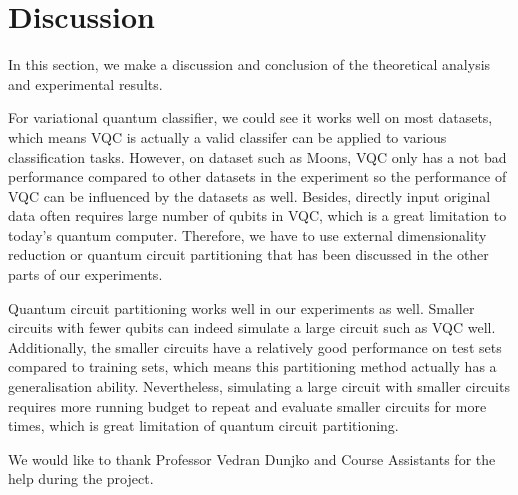 \documentclass[sigconf]{acmart}
\begin{document}

\section{Discussion}
In this section, we make a discussion and conclusion of the theoretical analysis and experimental results.

For variational quantum classifier, we could see it works well on most datasets, which means VQC is actually a valid classifer can be applied to various classification tasks. However, on dataset such as Moons, VQC only has a not bad performance compared to other datasets in the experiment so the performance of VQC can be influenced by the datasets as well. Besides, directly input original data often requires large number of qubits in VQC, which is a great limitation to today's quantum computer. Therefore, we have to use external dimensionality reduction or quantum circuit partitioning that has been discussed in the other parts of our experiments.

Quantum circuit partitioning works well in our experiments as well. Smaller circuits with fewer qubits can indeed simulate a large circuit such as VQC well. Additionally, the smaller circuits have a relatively good performance on test sets compared to training sets, which means this partitioning method actually has a generalisation ability. Nevertheless, simulating a large circuit with smaller circuits requires more running budget to repeat and evaluate smaller circuits for more times, which is great limitation of quantum circuit partitioning. 

\begin{acks}
We would like to thank Professor Vedran Dunjko and Course Assistants for the help during the project.
\end{acks}




\end{document}
